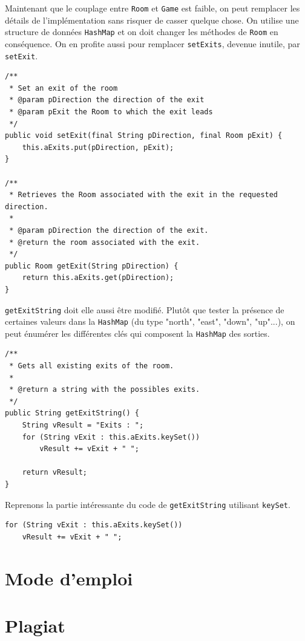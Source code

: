 \documentclass[a4paper,12pt]{report}
\begin{document}
\begin{exercise}[subtitle=HashMap et setExit]

Maintenant que le couplage entre \verb|Room| et \verb|Game| est faible, on peut remplacer les détails de l'implémentation sans risquer de casser quelque chose. On utilise une structure de données \verb|HashMap| et on doit changer les méthodes de \verb|Room| en conséquence. On en profite aussi pour remplacer \verb|setExits|, devenue inutile, par \verb|setExit|.

\vfill

\begin{verbatim}
/**
 * Set an exit of the room
 * @param pDirection the direction of the exit
 * @param pExit the Room to which the exit leads
 */
public void setExit(final String pDirection, final Room pExit) {
    this.aExits.put(pDirection, pExit);
}

/**
 * Retrieves the Room associated with the exit in the requested direction.
 *
 * @param pDirection the direction of the exit.
 * @return the room associated with the exit.
 */
public Room getExit(String pDirection) {
    return this.aExits.get(pDirection);
}
\end{verbatim}
\end{exercise}

\begin{exercise}[subtitle=keySet]

\verb|getExitString| doit elle aussi être modifié. Plutôt que tester la présence de certaines valeurs dans la \verb|HashMap| (du type "north", "east", "down", "up"...), on peut énumérer les différentes clés qui composent la \verb|HashMap| des sorties.

\begin{verbatim}
/**
 * Gets all existing exits of the room.
 *
 * @return a string with the possibles exits.
 */
public String getExitString() {
    String vResult = "Exits : ";
    for (String vExit : this.aExits.keySet())
        vResult += vExit + " ";

    return vResult;
}
\end{verbatim}
\end{exercise}

\begin{exercise}[subtitle=Explication de keySet] 

Reprenons la partie intéressante du code de \verb|getExitString| utilisant \verb|keySet|.

\begin{verbatim}
for (String vExit : this.aExits.keySet())
    vResult += vExit + " ";
\end{verbatim}


\end{exercise}

\chapter{Mode d'emploi}

\chapter{Plagiat}
\end{document}
